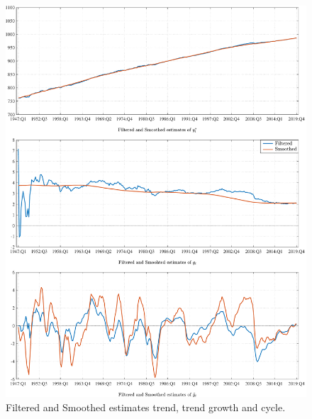 \documentclass[a4paper,final,12pt]{article}
\begin{document}
\begin{figure}[p!]
\centering
\includegraphics[angle=00, width=1\textwidth,trim={0 0 0 0},clip]{Clark_SSM} 
\vspace*{-2.5mm}
\caption{Filtered and Smoothed estimates trend, trend growth and cycle.}
\label{fig:KFS}
\end{figure}
\end{document}
